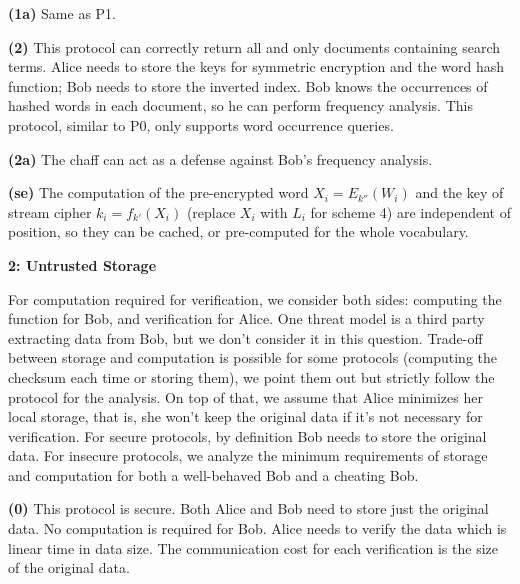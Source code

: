 \documentclass[10pt]{article}
\newcommand\question[2]{\vspace{.1in}\textbf{#1: #2}\vspace{.5em}\vspace{.10in}}
\renewcommand\part[1]{\vspace{.10in}\textbf{(#1)}}
\begin{document}
\part{1a}
Same as P1.

\part{2} 
This protocol can correctly return all and only documents containing search
terms. 
Alice needs to store the keys for symmetric encryption and the word hash
function; Bob needs to store the inverted index. 
Bob knows the occurrences of hashed words in each document, so he can perform
frequency analysis.
This protocol, similar to P0, only supports word occurrence queries.

\part{2a}
The chaff can act as a defense against Bob's frequency analysis.

\part{se}
The computation of the pre-encrypted word $X_i=E_{k''}(W_i)$ and the key of
stream cipher $k_i=f_{k'}(X_i)$ (replace $X_i$ with $L_i$ for scheme 4) are
independent of position, so they can be cached, or pre-computed for the whole
vocabulary.

\newpage
\question{2}{Untrusted Storage}

For computation required for verification, we consider both sides: computing the
function for Bob, and verification for Alice.
One threat model is a third party extracting data from Bob, but we don't
consider it in this question.
Trade-off between storage and computation is possible for some protocols
(computing the checksum each time or storing them), we point them out but
strictly follow the protocol for the analysis. On top of that, we assume that
Alice minimizes her local storage, that is, she won't keep the original data if
it's not necessary for verification.
For secure protocols, by definition Bob needs to store the original data.
For insecure protocols, we analyze the minimum requirements of storage and
computation for both a well-behaved Bob and a cheating Bob.

\part{0}
This protocol is secure.
Both Alice and Bob need to store just the original data.
No computation is required for Bob. Alice needs to verify the data
which is linear time in data size. 
The communication cost for each verification is the size of the original data.
\end{document}
